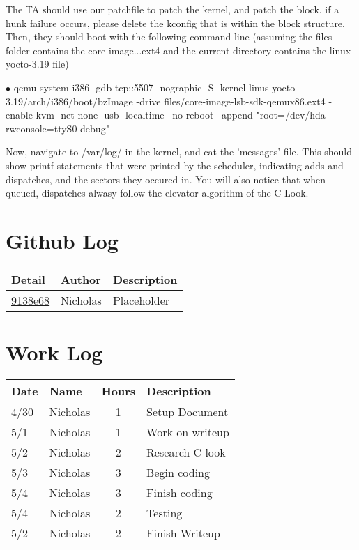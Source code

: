 \documentclass[letterpaper,10pt,fleqn,draftclsnofoot,onecolumn]{IEEEtran}
\begin{document}
	The TA should use our patchfile to patch the kernel, and patch the block. if a hunk failure occurs, please delete the kconfig that is within the block structure. Then, they should boot with the following command line (assuming the files folder contains the core-image...ext4 and the current directory contains the linux-yocto-3.19 file)
	
	$\bullet$ qemu-system-i386 -gdb tcp::5507 -nographic -S -kernel linus-yocto-3.19/arch/i386/boot/bzImage -drive files/core-image-lsb-sdk-qemux86.ext4 -enable-kvm -net none -usb -localtime --no-reboot --append "root=/dev/hda rwconsole=ttyS0 debug"
	
	Now, navigate to /var/log/ in the kernel, and cat the 'messages' file. This should show printf statements that were printed by the scheduler, indicating adds and dispatches, and the sectors they occured in. You will also notice that when queued, dispatches alwasy follow the elevator-algorithm of the C-Look.
	 
	\section*{ Github Log }
	\begin{tabular}{l l p{1.5in}}\textbf{Detail} & \textbf{Author} & \textbf{Description}\\\hline
		\href{https://github.com/Skinnern/CS444/commit/9138e6857021329354027c49c35fea1604fd5585}{9138e68} & Nicholas & Placeholder\\\hline
	\end{tabular}
	
	
	\section*{Work Log}
	\begin{tabular}{l l c p{1.1in}}\textbf{Date} & \textbf{Name} & \textbf{Hours} & \textbf{Description}\\\hline
		4/30 & Nicholas & 1 & Setup Document\\\hline
		5/1 & Nicholas & 1 & Work on writeup\\\hline
		5/2 & Nicholas & 2 & Research C-look\\\hline
		5/3 & Nicholas & 3 & Begin coding\\\hline
		5/4 & Nicholas & 3 & Finish coding\\\hline
		5/4 & Nicholas & 2 & Testing\\\hline
		5/2 & Nicholas & 2 & Finish Writeup\\\hline
	\end{tabular}
		
	
\end{document}
